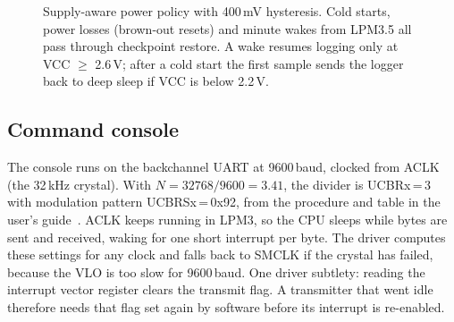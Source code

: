 \documentclass[conference]{IEEEtran}
\begin{document}
\begin{figure}[t]
\centering
{}
\caption{Supply-aware power policy with 400\,mV hysteresis. Cold starts, power losses (brown-out resets) and minute wakes from LPM3.5 all pass through checkpoint restore. A wake resumes logging only at VCC $\geq$ 2.6\,V; after a cold start the first sample sends the logger back to deep sleep if VCC is below 2.2\,V.}
\label{fig:fsm}
\end{figure}

\subsection{Command console}

The console runs on the backchannel UART at 9600\,baud, clocked from ACLK (the 32\,kHz crystal). With $N = 32768/9600 = 3.41$, the divider is UCBRx\,=\,3 with modulation pattern UCBRSx\,=\,0x92, from the procedure and table in the user's guide~\cite{ti_slau367}. ACLK keeps running in LPM3, so the CPU sleeps while bytes are sent and received, waking for one short interrupt per byte. The driver computes these settings for any clock and falls back to SMCLK if the crystal has failed, because the VLO is too slow for 9600\,baud. One driver subtlety: reading the interrupt vector register clears the transmit flag. A transmitter that went idle therefore needs that flag set again by software before its interrupt is re-enabled.
\end{document}
